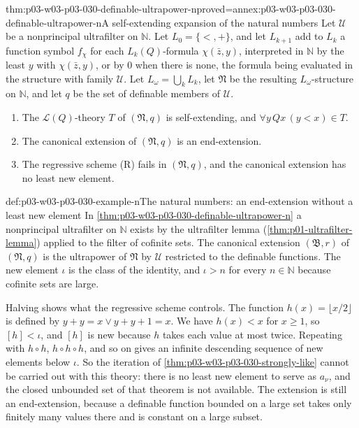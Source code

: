 \begin{hblemma}{thm:p03-w03-p03-030-definable-ultrapower-n}{proved=annex:p03-w03-p03-030-definable-ultrapower-n}{A self-extending expansion of the natural numbers}
Let \(\mathcal U\) be a nonprincipal ultrafilter on \(\mathbb N\).  Let
\(L_0=\{<,+\}\), and let \(L_{k+1}\) add to \(L_k\) a function symbol
\(f_\chi\) for each \(L_k(Q)\)-formula \(\chi(\bar z,y)\), interpreted in
\(\mathbb N\) by the least \(y\) with \(\chi(\bar z,y)\), or by \(0\) when
there is none, the formula being evaluated in the structure with family
\(\mathcal U\).  Let \(L_\omega=\bigcup_kL_k\), let \(\mathfrak N\) be the
resulting \(L_\omega\)-structure on \(\mathbb N\), and let \(q\) be the set of
definable members of \(\mathcal U\).
\begin{enumerate}
\item The \(\mathscr L(Q)\)-theory \(T\) of \((\mathfrak N,q)\) is
  self-extending, and \(\forall y\,Qx\,(y<x)\in T\).
\item The canonical extension of \((\mathfrak N,q)\) is an end-extension.
\item The regressive scheme (R) fails in \((\mathfrak N,q)\), and the
  canonical extension has no least new element.
\end{enumerate}
\end{hblemma}

\begin{hbexample}{def:p03-w03-p03-030-example-n}{The natural numbers: an end-extension without a least new element}
In \cref{thm:p03-w03-p03-030-definable-ultrapower-n} a nonprincipal
ultrafilter on \(\mathbb N\) exists by the ultrafilter lemma
(\cref{thm:p01-ultrafilter-lemma}) applied to the filter of cofinite sets.
The canonical extension \((\mathfrak B,r)\) of \((\mathfrak N,q)\) is the
ultrapower of \(\mathfrak N\) by \(\mathcal U\) restricted to the definable
functions.  The new element \(\iota\) is the class of the identity, and
\(\iota>n\) for every \(n\in\mathbb N\) because cofinite sets are large.

Halving shows what the regressive scheme controls.  The function
\(h(x)=\lfloor x/2\rfloor\) is defined by \(y+y=x\vee y+y+1=x\).  We have
\(h(x)<x\) for \(x\ge1\), so \([h]<\iota\), and \([h]\) is new because
\(h\) takes each value at most twice.  Repeating with \(h\circ h\),
\(h\circ h\circ h\), and so on gives an infinite descending sequence of new
elements below \(\iota\).  So the iteration of
\cref{thm:p03-w03-p03-030-strongly-like} cannot be carried out with this
theory: there is no least new element to serve as \(a_\nu\), and the closed
unbounded set of that theorem is not available.  The extension is still an
end-extension, because a definable function bounded on a large set takes
only finitely many values there and is constant on a large subset.
\end{hbexample}

